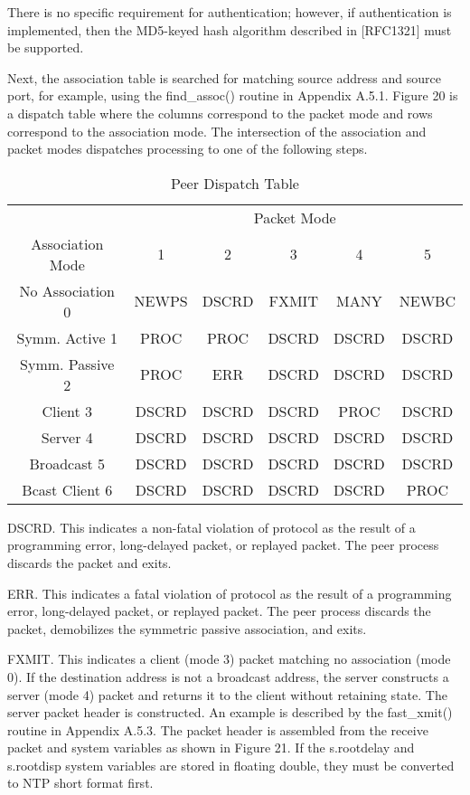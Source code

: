 There is no specific requirement for authentication; however, if
authentication is implemented, then the MD5-keyed hash algorithm
described in [RFC1321] must be supported.

Next, the association table is searched for matching source address
and source port, for example, using the find\_assoc() routine in
Appendix A.5.1. Figure 20 is a dispatch table where the columns
correspond to the packet mode and rows correspond to the association
mode. The intersection of the association and packet modes
dispatches processing to one of the following steps.

\begin{table}[htb]
\center
\begin{tabular}{c | c | c | c | c | c}
 & \multicolumn{5}{c}{Packet Mode} \\
Association Mode & 1 & 2 & 3 & 4 & 5 \\
\hline
\hline
No Association 0 & NEWPS & DSCRD & FXMIT & MANY & NEWBC \\
Symm. Active 1 & PROC & PROC & DSCRD & DSCRD & DSCRD \\
Symm. Passive 2 & PROC & ERR & DSCRD & DSCRD & DSCRD \\
Client 3 & DSCRD & DSCRD & DSCRD & PROC & DSCRD \\
Server 4 & DSCRD & DSCRD & DSCRD & DSCRD & DSCRD \\
Broadcast 5 & DSCRD & DSCRD & DSCRD & DSCRD & DSCRD \\
Bcast Client 6 & DSCRD & DSCRD & DSCRD & DSCRD & PROC \\
\hline
\end{tabular}
\label{peer_dispatch_table}
\caption{Peer Dispatch Table}
\end{table}

DSCRD. This indicates a non-fatal violation of protocol as the
result of a programming error, long-delayed packet, or replayed
packet. The peer process discards the packet and exits.

ERR. This indicates a fatal violation of protocol as the result of a
programming error, long-delayed packet, or replayed packet. The peer
process discards the packet, demobilizes the symmetric passive
association, and exits.

FXMIT. This indicates a client (mode 3) packet matching no
association (mode 0). If the destination address is not a broadcast
address, the server constructs a server (mode 4) packet and returns
it to the client without retaining state. The server packet header
is constructed. An example is described by the fast\_xmit() routine
in Appendix A.5.3. The packet header is assembled from the receive
packet and system variables as shown in Figure 21. If the
s.rootdelay and s.rootdisp system variables are stored in floating
double, they must be converted to NTP short format first.

